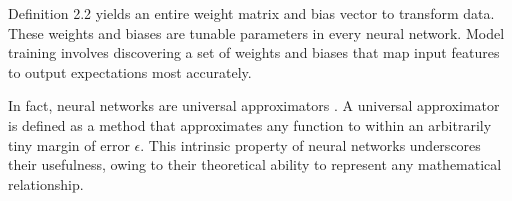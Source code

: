 \documentclass{article}
\theoremstyle{definition}
\newtheorem{theorem}{Theorem}[section]
\begin{document}
Definition 2.2 yields an entire weight matrix and bias vector to transform data. These weights and biases are tunable parameters in every neural network. Model training involves discovering a set of weights and biases that map input features to output expectations most accurately. 

In fact, neural networks are universal approximators \cite{uat}. A universal approximator is defined as a method that approximates any function to within an arbitrarily tiny margin of error $\epsilon$. This intrinsic property of neural networks underscores their usefulness, owing to their theoretical ability to represent any mathematical relationship. 

\end{document}

